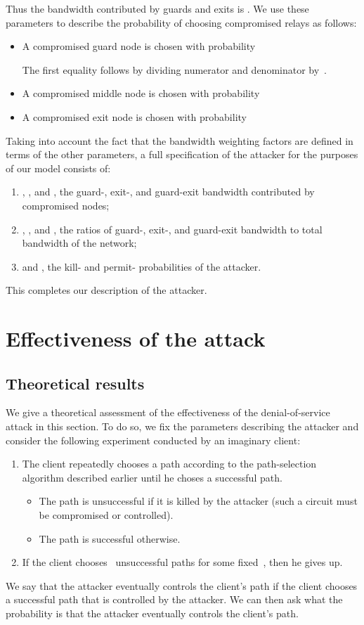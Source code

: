 \documentclass[]{lmcs}
\begin{document}
Thus the bandwidth contributed by guards and exits is
.
We use these parameters to describe the probability of choosing
compromised relays as follows:
\begin{itemize}
\item A compromised guard node is chosen with probability

The first equality follows by dividing numerator and denominator by~.
\item A compromised middle node is chosen with probability

\item A compromised exit node is chosen with probability

\end{itemize}

Taking into account the fact that the
bandwidth weighting factors
are defined in terms of the other parameters, a full specification
of the attacker for the purposes of our model consists of:
\begin{enumerate}
\item , , and , the guard-, exit-, and guard-exit bandwidth
contributed by compromised nodes;
\item , , and , the ratios of guard-, exit-, and
guard-exit bandwidth to total bandwidth of the network;
\item  and , the kill- and permit- probabilities
of the attacker.
\end{enumerate}
This completes our description of the attacker.

\section{Effectiveness of the attack}
\label{sec:effectiveness}

\subsection{Theoretical results}
\label{sec:theory-eff}

We give a theoretical assessment of the effectiveness of the denial-of-service
attack in this section.  To do so, we fix the parameters describing
the attacker and consider the following experiment conducted by an 
imaginary client:
\begin{enumerate}
\item The client repeatedly chooses a path according to the path-selection 
algorithm described earlier until he choses a successful path.
\begin{itemize}
\item The path is unsuccessful if it is 
killed by the attacker (such a circuit must be compromised or controlled).
\item The path is successful otherwise.
\end{itemize}
\item If the client chooses~ unsuccessful paths for some fixed~, 
then he gives up.
\end{enumerate}
We say that the attacker eventually controls the client's path if
the client chooses a successful path that is controlled by the attacker.
We can then ask what the probability is that the attacker eventually
controls the client's path.
\end{document}
